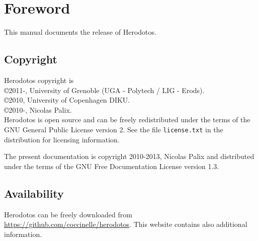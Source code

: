 
\chapter*{Foreword}

This manual documents the release \version of Herodotos.


\section*{Copyright}

Herodotos copyright is\\
\copyright 2011-\the\year, University of Grenoble (UGA - Polytech / LIG - Erods).\\
\copyright 2010, University of Copenhagen DIKU.\\
\copyright 2010-\the\year, Nicolas Palix.\\

Herodotos is open source and can be freely redistributed under the
terms of the GNU General Public License version 2. See the file
\texttt{license.txt} in the distribution for licensing information.

The present documentation is copyright 2010-2013, Nicolas Palix and
distributed under the terms of the GNU Free Documentation License
version 1.3.

\section*{Availability}

Herodotos can be freely downloaded
from \url{https://github.com/coccinelle/herodotos}.
This website contains also additional information.


